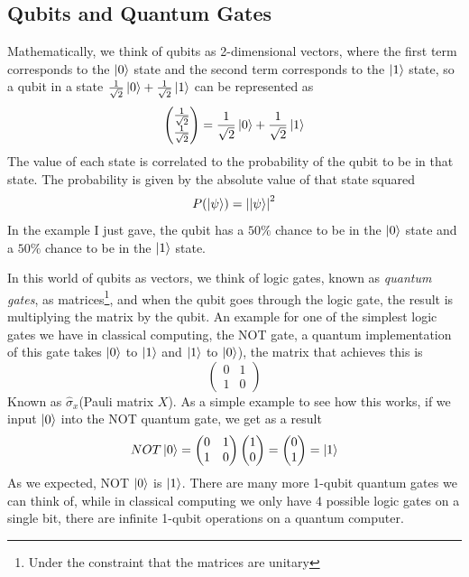 \documentclass[english, a4paper, 12pt, twoside]{article}
\numberwithin{equation}{section} %
\begin{document}
\subsection{Qubits and Quantum Gates}
Mathematically, we think of qubits as 2-dimensional vectors, where the first term corresponds to the $\ket{0}$ state and the second term corresponds to the $\ket{1}$ state, so a qubit in a state $\frac{1}{\sqrt{2}} \ket{0} + \frac{1}{\sqrt{2}} \ket{1}$ can be represented as
\[
\begin{pmatrix}
    \frac{1}{\sqrt{2}} \\
    \frac{1}{\sqrt{2}} 
\end{pmatrix} = \frac{1}{\sqrt{2}} \ket{0} + \frac{1}{\sqrt{2}} \ket{1}
\]
The value of each state is correlated to the probability of the qubit to be in that state. The probability is given by the absolute value of that state squared
\[
    P(\ket{\psi}) = \abs{\ket{\psi}}^2
\]
In the example I just gave, the qubit has a $50\%$ chance to be in the $\ket{0}$ state and a $50\%$ chance to be in the $\ket{1}$ state.

In this world of qubits as vectors, we think of logic gates, known as \textit{quantum gates}, as matrices\footnote{Under the constraint that the matrices are unitary}, and when the qubit goes through the logic gate, the result is multiplying the matrix by the qubit. An example for one of the simplest logic gates we have in classical computing, the NOT gate, a quantum implementation of this gate takes $\ket{0}$ to $\ket{1}$ and $\ket{1}$ to $\ket{0}$), the matrix that achieves this is 
\[
\begin{pmatrix}
    0 & 1 \\
    1 & 0
\end{pmatrix}
\]
Known as $\hat{\sigma}_x$(Pauli matrix $X$). As a simple example to see how this works, if we input $\ket{0}$ into the NOT quantum gate, we get as a result
\[
NOT \ket{0} = 
\begin{pmatrix}
    0 & 1 \\
    1 & 0
\end{pmatrix}
\begin{pmatrix}
    1 \\
    0
\end{pmatrix} = 
\begin{pmatrix}
    0 \\
    1
\end{pmatrix} = \ket{1}
\]
As we expected, NOT $\ket{0}$ is $\ket{1}$. There are many more 1-qubit quantum gates we can think of, while in classical computing we only have 4 possible logic gates on a single bit, there are infinite  1-qubit operations on a quantum computer.
\end{document}
